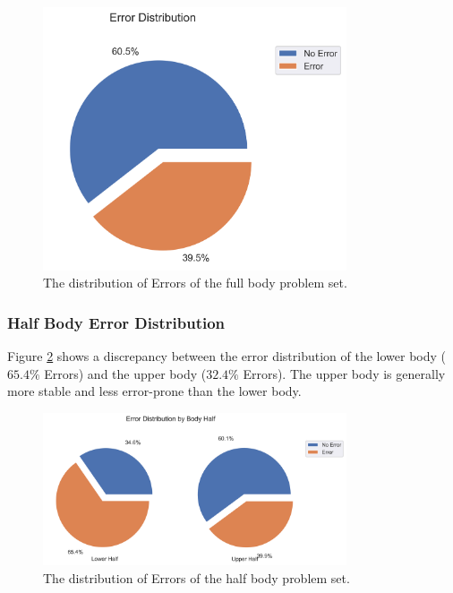 \begin{figure}[ht]
  \centering
  \includegraphics[width=0.8\textwidth]{figures/Data/dist_full_body/Error_Distribution.png}
  \caption[Error Distribution of the Full Body]{The distribution of Errors of the full body problem set.}
  \label{fig:fb_pie}
\end{figure}

\subsubsection{Half Body Error Distribution}

Figure \ref{fig:hb_pie} shows a discrepancy between the error distribution of the lower body ($65.4\%$ Errors) and the upper body ($32.4\%$ Errors). The upper body is generally more stable and less error-prone than the lower body.

\begin{figure}[ht]
  \centering
  \includegraphics[width=0.8\textwidth]{figures/Data/dist_half_body/Error_Distribution_by_Body_Half.png}
  \caption[Error Distribution by Body Half]{The distribution of Errors of the half body problem set.}
  \label{fig:hb_pie}
\end{figure}

